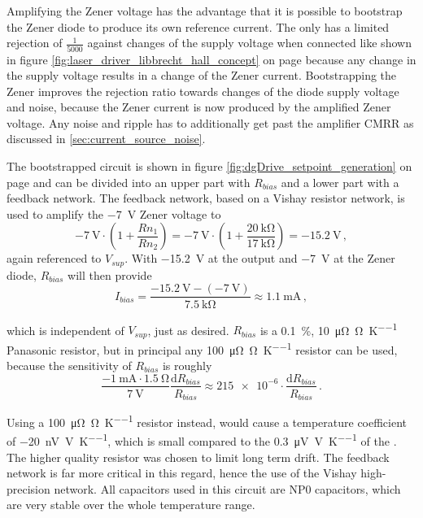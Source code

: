 Amplifying the Zener voltage has the advantage that it is possible to bootstrap the Zener diode to produce its own reference current. The  only has a limited rejection of $\frac{1}{5000}$ against changes of the supply voltage when connected like shown in figure \ref{fig:laser_driver_libbrecht_hall_concept} on page \pageref{fig:laser_driver_libbrecht_hall_concept} because any change in the supply voltage results in a change of the Zener current. Bootstrapping the Zener improves the rejection ratio towards changes of the diode supply voltage and noise, because the Zener current is now produced by the amplified Zener voltage. Any noise and ripple has to additionally get past the amplifier CMRR as discussed in \ref{sec:current_source_noise}.

The bootstrapped circuit is shown in figure \ref{fig:dgDrive_setpoint_generation} on page \pageref{fig:dgDrive_setpoint_generation} and can be divided into an upper part with $R_{bias}$ and a lower part with a feedback network. The feedback network, based on a Vishay  \cite{datasheet_300144Z} resistor network, is used to amplify the \qty{-7}{\V} Zener voltage to
\begin{equation*}
    \qty{-7}{\V} \cdot \left(1 + \frac{Rn_1}{Rn_2}\right) = \qty{-7}{\V} \cdot \left(1 + \frac{\qty{20}{\kilo\ohm}}{\qty{17}{\kilo\ohm}}\right) = \qty{-15.2}{\V}\,,
\end{equation*}
again referenced to $V_{sup}$. With \qty{-15.2}{\V} at the output and \qty{-7}{\V} at the Zener diode, $R_{bias}$ will then provide
\begin{equation*}
    I_{bias} = \frac{\qty{-15.2}{\V} - (\qty{-7}{\V})}{\qty{7.5}{\kilo\ohm}} \approx \qty{1.1}{\mA} \,,
\end{equation*}

which is independent of $V_{sup}$, just as desired. $R_{bias}$ is a \qty{0.1}{\percent}, \qty{10}{\micro\ohm \per \ohm \per \K} Panasonic  resistor, but in principal any \qty{100}{\micro\ohm \per \ohm \per \K} resistor can be used, because the sensitivity of $R_{bias}$ is roughly
\begin{equation}
    \frac{\qty{-1}{\mA} \cdot \qty{1.5}{\ohm}}{\qty{7}{\V}} \frac{\mathrm{d} R_{bias}}{R_{bias}} \approx \num{215e-6} \cdot \frac{\mathrm{d} R_{bias}}{R_{bias}}\,.
\end{equation}

Using a \qty{100}{\micro\ohm \per \ohm \per \K} resistor instead, would cause a temperature coefficient of \qty{-20}{\nV \per \V \per \K}, which is small compared to the \qty{0.3}{\uV \per \V \per \K} of the . The higher quality resistor was chosen to limit long term drift. The feedback network is far more critical in this regard, hence the use of the Vishay  high-precision network. All capacitors used in this circuit are NP0 capacitors, which are very stable over the whole temperature range.

